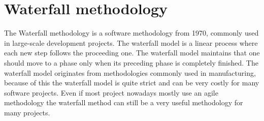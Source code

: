 \section{Waterfall methodology}
The Waterfall methodology is a software methodology from 1970, commonly used in large-scale development projects. \cite{waterfall} The waterfall model is a linear process where each new step follows the proceeding one. The waterfall model maintains that one should move to a phase only when its preceding phase is completely finished. The waterfall model originates from methodologies commonly used in manufacturing, because of this the waterfall model is quite strict and can be very costly for many software projects. Even if most project nowadays mostly use an agile methodology the waterfall method can still be a very useful methodology for many projects.



